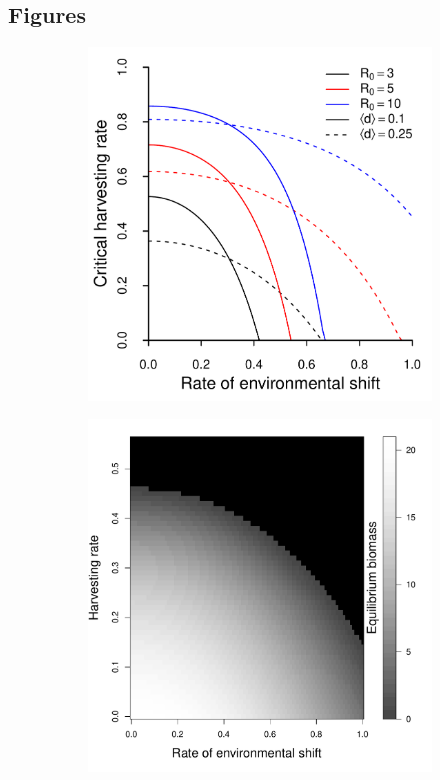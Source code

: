 \documentclass[12pt,english]{article}
\begin{document}
\begin{spacing}{1.9}
\section{Figures}

\begin{figure}[htbp]
\begin{subfigure}{3in}
\subcaption{\label{rates}}
\includegraphics[width=\textwidth]{plots/critical_rates.pdf}
\end{subfigure}
\begin{subfigure}{3in}
\subcaption{\label{biomass}}
\includegraphics[width=\textwidth]{plots/eqbiomass.pdf}
\end{subfigure}


\end{figure}
\end{spacing}
\end{document}
